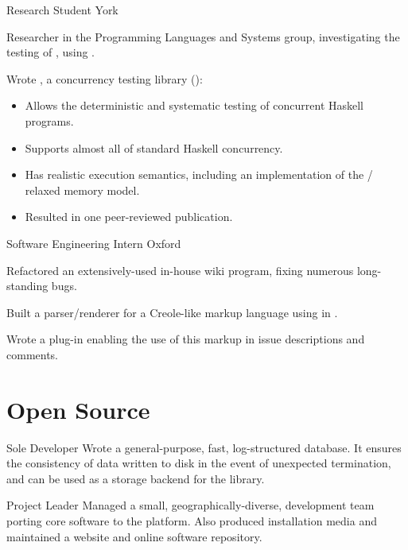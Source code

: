 \documentclass[a4paper]{barrucadu-cv}
\begin{document}
  {Research Student}
  {York}
  {\begin{tightitemize}
    \item Researcher in the Programming Languages and Systems group,
      investigating the testing of ,
      using .
    \item Wrote , a concurrency testing library
      (\textbf{}):
      \begin{itemize}
      \item Allows the deterministic and systematic testing of
        concurrent Haskell programs.
      \item Supports almost all of standard Haskell concurrency.
      \item Has realistic execution semantics, including an
        implementation of the  / 
        relaxed memory model.
      \item Resulted in one peer-reviewed publication.
      \end{itemize}
    \end{tightitemize}}

  {Software Engineering Intern}
  {Oxford}
  {\begin{tightitemize}
    \item Refactored an extensively-used in-house wiki program, fixing
      numerous long-standing bugs.
    \item Built a parser/renderer for a Creole-like markup language
      using  in .
    \item Wrote a  plug-in enabling the use of this
      markup in issue descriptions and comments.
    \end{tightitemize}}

\section{Open Source}

  {Sole Developer}
  {}
  {Wrote a  general-purpose, fast, log-structured
    database. It ensures the consistency of data written to disk in
    the event of unexpected termination, and can be used as a storage
    backend for the  library.}

  {Project Leader}
  {}
  {Managed a small, geographically-diverse, development team porting
    core  software to the  platform.
    Also produced installation media and maintained a website and
    online software repository.}
\end{document}
